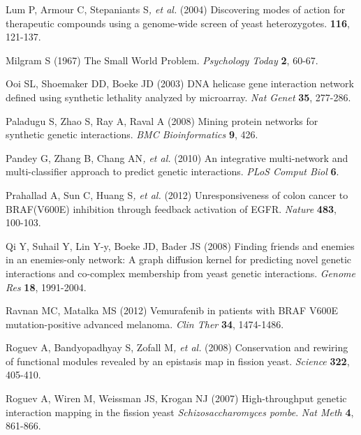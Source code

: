 Lum P, Armour C, Stepaniants S\textit{, et al.} (2004) Discovering modes
of action for therapeutic compounds using a genome-wide screen of yeast
heterozygotes. \textbf{116}, 121-137.



Milgram S (1967) The Small World Problem. \textit{Psychology Today}
\textbf{2}, 60-67.



Ooi SL, Shoemaker DD, Boeke JD (2003) DNA helicase gene interaction
network defined using synthetic lethality analyzed by microarray.
\textit{Nat Genet} \textbf{35}, 277-286.



\hypertarget{ENREF78}{}Paladugu S, Zhao S, Ray A, Raval A (2008) Mining
protein networks for synthetic genetic interactions. \textit{BMC
Bioinformatics} \textbf{9}, 426.



\hypertarget{ENREF79}{}Pandey G, Zhang B, Chang AN\textit{, et al.}
(2010) An integrative multi-network and multi-classifier approach to
predict genetic interactions. \textit{PLoS Comput Biol} \textbf{6}.



\hypertarget{ENREF80}{}Prahallad A, Sun C, Huang S\textit{, et al.}
(2012) Unresponsiveness of colon cancer to BRAF(V600E) inhibition
through feedback activation of EGFR. \textit{Nature} \textbf{483},
100-103.



\hypertarget{ENREF81}{}Qi Y, Suhail Y, Lin Y-y, Boeke JD, Bader JS
(2008) Finding friends and enemies in an enemies-only network: A graph
diffusion kernel for predicting novel genetic interactions and
co-complex membership from yeast genetic interactions. \textit{Genome
Res} \textbf{18}, 1991-2004.



\hypertarget{ENREF82}{}Ravnan MC, Matalka MS (2012) Vemurafenib in
patients with BRAF V600E mutation-positive advanced melanoma.
\textit{Clin Ther} \textbf{34}, 1474-1486.



Roguev A, Bandyopadhyay S, Zofall M\textit{, et al.} (2008) Conservation
and rewiring of functional modules revealed by an epistasis map in
fission yeast. \textit{Science} \textbf{322}, 405-410.



Roguev A, Wiren M, Weissman JS, Krogan NJ (2007) High-throughput genetic
interaction mapping in the fission yeast \textit{Schizosaccharomyces
pombe}. \textit{Nat Meth} \textbf{4}, 861-866.



